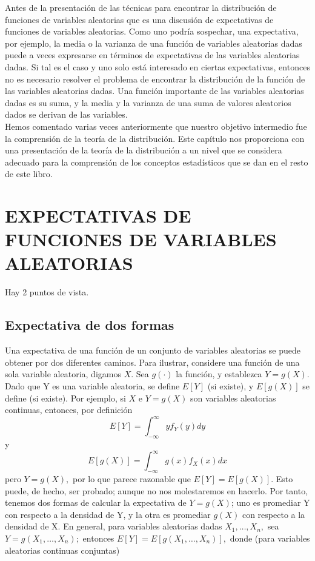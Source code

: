Antes de la presentación de las técnicas para encontrar la distribución de funciones de variables aleatorias que es una discusión de expectativas de funciones de variables aleatorias. Como uno podría sospechar, una expectativa, por ejemplo, la media o la varianza de una función de variables aleatorias dadas puede a veces expresarse en términos de expectativas de las variables aleatorias dadas. Si tal es el caso y uno solo está interesado en ciertas expectativas, entonces no es necesario resolver el problema de encontrar la distribución de la función de las variables aleatorias dadas. Una función importante de las variables aleatorias dadas es su suma, y la media y la varianza de una suma de valores aleatorios dados se derivan de las variables.\\

Hemos comentado varias veces anteriormente que nuestro objetivo intermedio fue la comprensión de la teoría de la distribución. Este capítulo nos proporciona con una presentación de la teoría de la distribución a un nivel que se considera adecuado para la comprensión de los conceptos estadísticos que se dan en el resto de este libro.

\section{EXPECTATIVAS DE FUNCIONES DE VARIABLES ALEATORIAS}
Hay 2 puntos de vista.
\subsection{Expectativa de dos formas}

Una expectativa de una función de un conjunto de variables aleatorias se puede obtener por dos diferentes caminos. Para ilustrar, considere una función de una sola variable aleatoria, digamos $X .$ Sea $g(\cdot)$ la función, y establezca $Y=g(X)$. Dado que Y es una variable aleatoria, se define $E[Y]$ (si existe), y $E[g(X)]$ se define (si existe). Por ejemplo, si $X$ e $Y=g(X)$  son variables aleatorias continuas, entonces, por definición
$$
E[Y]=\int_{-\infty}^{\infty} y f_{Y}(y) d y
$$
y
$$
E[g(X)]=\int_{-\infty}^{\infty} g(x) f_{X}(x) d x
$$
pero $Y=g(X),$ por lo que parece razonable que $E[Y]=E[g(X)] .$ Esto puede, de hecho, ser probado; aunque no nos molestaremos en hacerlo. Por tanto, tenemos dos formas de calcular la expectativa de $Y=g(X)$; uno es promediar Y con respecto a la densidad de Y, y la otra es promediar $g(X)$ con respecto a la densidad de X. En general, para variables aleatorias dadas $X_{1}, \ldots, X_{n},$ sea $Y=g\left(X_{1}, \ldots, X_{n}\right) ;$ entonces $E[Y]=E\left[g\left(X_{1}, \ldots, X_{n}\right)\right],$ donde (para variables aleatorias continuas conjuntas)

